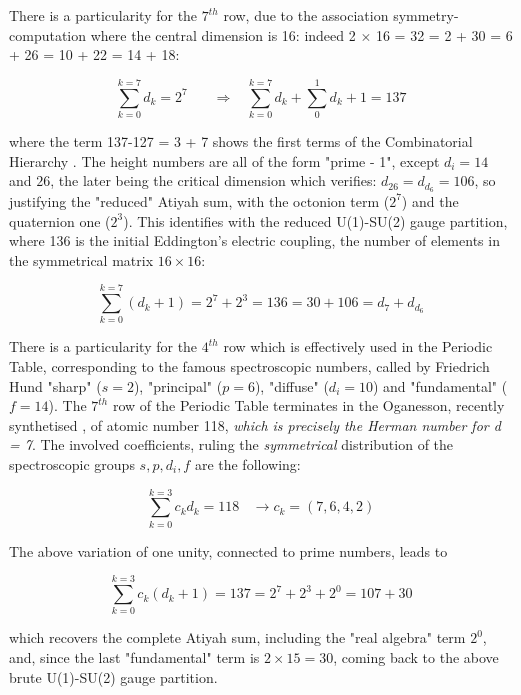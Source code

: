 \documentclass[a4paper,9pt]{article}
\newcounter{row}
\begin{document}
There is a particularity for the $7^{th}$ row, due to the association symmetry-computation where the central dimension is 16: indeed 2 $\times$ 16 = 32 = 2 + 30 = 6 + 26 = 10 + 22 = 14 + 18:  

\begin{equation}\label{Eq47}
 \sum_{k=0}^{k=7} d_k = 2^7~~~~~~~~\Rightarrow~~~~  \sum_{k=0}^{k=7} d_k + \sum_0^1{d_k + 1} = 137
 \end{equation}

 where the term 137-127 = 3 + 7 shows the first terms of the Combinatorial Hierarchy \cite{Bastin}. The height numbers are all of the form "prime - 1", except $d_i = 14$ and $26$, the later being the critical dimension which verifies: $ d_{26} = d_{d_6} = 106 $, so justifying the "reduced" Atiyah sum, with the octonion term ($2^7$) and the quaternion one ($2^3$). This identifies with the reduced U(1)-SU(2) gauge partition, where 136 is the initial Eddington's electric coupling, the number of elements in the symmetrical matrix $16\times16$: 

\begin{equation}\label{Eq48}
 \sum_{k=0}^{k=7} (d_k+1)= 2^7 + 2^3 = 136 = 30 + 106 = d_7 + d_{d_6}
 \end{equation}
  

There is a particularity for the $4^{th}$ row which is effectively used in the Periodic Table, corresponding to the famous spectroscopic numbers, called by Friedrich Hund "sharp" ($s = 2$), "principal" ($p = 6$), "diffuse" ($d_i = 10$) and "fundamental" ($f = 14$). The $7^{th}$ row of the Periodic Table terminates in the Oganesson, recently synthetised \cite{Oganessian}, of atomic number 118, \textit{which is precisely the Herman number for d = 7}. The involved coefficients, ruling the \textit{symmetrical} distribution of the spectroscopic groups $s,p,d_i,f$ are the following:

\begin{equation}\label{Eq49}
 \sum_{k=0}^{k=3} c_k d_k = 118 ~~~~ \rightarrow   c_k = (7,6,4,2)
 \end{equation}

The above variation of one unity, connected to prime numbers, leads to

\begin{equation}\label{Eq50}
 \sum_{k=0}^{k=3} c_k (d_k + 1) = 137 = 2^7 + 2^3 + 2^0 = 107 + 30
 \end{equation}

which recovers the complete Atiyah sum, including the "real algebra" term $2^0$, and, since the last "fundamental" term is $2\times 15 = 30$, coming back to the above brute U(1)-SU(2) gauge partition.
\end{document}
